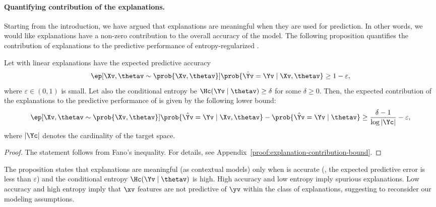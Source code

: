 \documentclass[twoside,11pt]{article}
\begin{document}
\vspace{-0.5ex}
\paragraph{Quantifying contribution of the explanations.}
Starting from the introduction, we have argued that explanations are meaningful when they are used for prediction.
In other words, we would like explanations have a non-zero contribution to the overall accuracy of the model.
The following proposition quantifies the contribution of explanations to the predictive performance of entropy-regularized {\CEN}.

\begin{proposition}
    \label{prop:explanation-contribution-bound}
    Let {\CEN} with linear explanations have the expected predictive accuracy
    \begin{equation}
        \label{eq:cen-predictive-acc-bound}
        \ep[\Xv, \thetav \sim \prob{\Xv, \thetav}]{\prob{\hat \Yv = \Yv \mid \Xv, \thetav}} \geq 1 - \varepsilon,
    \end{equation}
    where $\varepsilon \in (0, 1)$ is small.
    Let also the conditional entropy be $\Hc(\Yv \mid \thetav) \geq \delta$ for some $\delta \geq 0$.
    Then, the expected contribution of the explanations to the predictive performance of {\CEN} is given by the following lower bound:
    \begin{equation}
        \label{eq:cen-exp-contribution-bound}
        \ep[\Xv, \thetav \sim \prob{\Xv, \thetav}]{\prob{\hat \Yv = \Yv \mid \Xv, \thetav} - \prob{\hat \Yv = \Yv \mid \thetav}} \geq \frac{\delta - 1}{\log |\Yc|} - \varepsilon,
    \end{equation}
    where $|\Yc|$ denotes the cardinality of the target space.
\end{proposition}
\begin{proof}
    The statement follows from Fano's inequality. For details, see Appendix~\ref{proof:explanation-contribution-bound}.
\end{proof}
\vspace{-3ex}
\begin{remark}
    The proposition states that explanations are meaningful (as contextual models) only when {\CEN} is accurate (\ie, the expected predictive error is less than $\varepsilon$) and the conditional entropy $\Hc(\Yv \mid \thetav)$ is high.
    High accuracy and low entropy imply spurious explanations.
    Low accuracy and high entropy imply that $\xv$ features are not predictive of $\yv$ within the class of explanations, suggesting to reconsider our modeling assumptions.
\end{remark}
\end{document}
